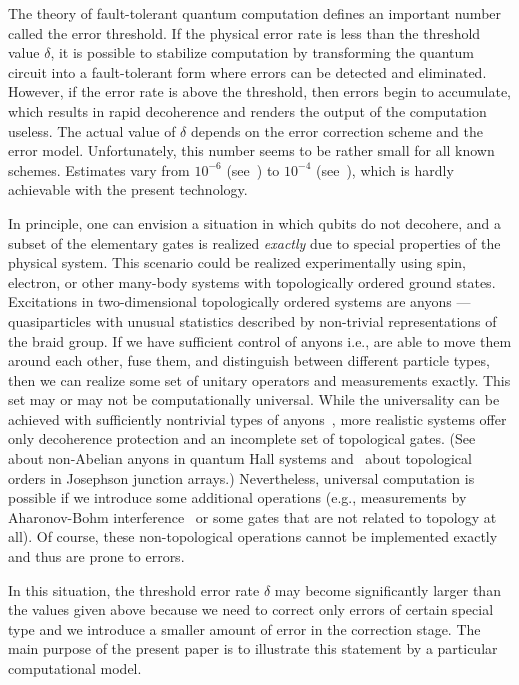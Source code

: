 \documentclass[pra,twocolumn,showpacs]{revtex4}
\begin{document}
The theory of fault-tolerant quantum computation defines an important number
called the error threshold. If the physical error rate is less than the
threshold value $\delta$, it is possible to stabilize computation by
transforming the quantum circuit into a fault-tolerant form where errors can
be detected and eliminated. However, if the error rate is above the threshold,
then errors begin to accumulate, which results in rapid decoherence and
renders the output of the computation useless. The actual value of $\delta$
depends on the error correction scheme and the error model.
Unfortunately, this number seems to be
rather small for all known schemes. Estimates vary from $10^{-6}$
(see~\cite{KLZ97}) to $10^{-4}$ (see~\cite{Zalka96,Steane97,DKLP01}), which is
hardly achievable with the present technology.

In principle, one can envision a situation in which qubits do not decohere,
and a subset of the elementary gates is realized {\it exactly} due to special
properties of the physical system. This scenario could be realized
experimentally using spin, electron, or other many-body systems with
topologically ordered ground states. Excitations in two-dimensional
topologically ordered systems are anyons --- quasiparticles with unusual
statistics described by non-trivial representations of the braid group. If we
have sufficient control of anyons i.e., are able to move them around each
other, fuse them, and distinguish between different particle types, then we
can realize some set of unitary operators and measurements exactly. This set
may or may not be computationally universal. While the universality can be
achieved with sufficiently nontrivial types of
anyons~\cite{Mochon04,Kitaev97,FLW00,FKLW01}, more realistic systems offer only
decoherence protection and an incomplete set of topological gates.
(See~\cite{MR91,NW96} about non-Abelian anyons in quantum Hall systems
and~\cite{DV01,FI02} about topological orders in Josephson junction arrays.)
Nevertheless, universal computation is possible if we introduce some
additional operations (e.g., measurements by Aharonov-Bohm
interference~\cite{Preskill97} or some gates that are not related to topology
at all). Of course, these non-topological operations cannot be implemented
exactly and thus are prone to errors.

In this situation, the threshold error rate $\delta$ may become significantly
larger than the values given above because we need to correct only errors of
certain special type and we introduce a smaller amount of error in the
correction stage. The main purpose of the present paper is to illustrate this
statement by a particular computational model.
\end{document}
